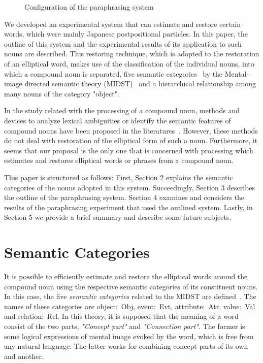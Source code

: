\begin{figure}[t]
\begin{center}
\unitlength=1mm
\hspace{10mm}
\end{center}
\vspace{-2mm}
\caption{Configuration of the paraphrasing system}
\vspace{2mm}
\end{figure}


We developed an experimental system that can estimate and restore
certain words, which were mainly Japanese postpositional particles.
In this paper, the outline of this system and the experimental results
of its application to such nouns are described. This restoring
technique, which is adopted to the restoration of an elliptical word,
makes use of the classification of the individual nouns, into which a
compound noun is separated, five semantic categories~\cite{Yokota94}
by the Mental-image directed semantic theory
(MIDST)~\cite{Yokota88a,Yokota91a} and a hierarchical relationship
among many nouns of the category "object".


In the study related with the processing of a compound noun,
methods and devices to analyze lexical ambiguities or identify the
semantic features of compound nouns have been proposed in the
literatures~\cite{Ishizaki90,Miyazaki84,Takeda87}. However, these
methods do not deal with restoration of the elliptical form of such a
noun. Furthermore, it seems that our proposal is the only one that is
concerned with processing which estimates and restores elliptical
words or phrases from a compound noun.


This paper is structured as follows: First, Section 2 explains
the semantic categories of the nouns adopted in this system.
Succeedingly, Section 3 describes the outline of the paraphrasing
system. Section 4 examines and considers the results of the
paraphrasing experiment that used the outlined system. Lastly, in
Section 5 we provide a brief summary and describe some future
subjects.

\section{Semantic Categories}
\vspace*{-0.1cm}

It is possible to efficiently estimate and restore the elliptical
words around the compound noun using the respective semantic
categories of its constituent nouns. In this case, the five {\it
semantic categories} related to the MIDST are defined~\cite{Yokota94}.
The names of these categories are object:~Obj, event:~Evt,
attribute:~Atr, value:~Val and relation:~Rel.  In this theory, it is
supposed that the meaning of a word consist of the two parts, {\it
"Concept part"} and {\it "Connection part"}. The former is some
logical expressions of mental image evoked by the word, which is free
from any natural language. The latter works for combining concept
parts of its own and another.

